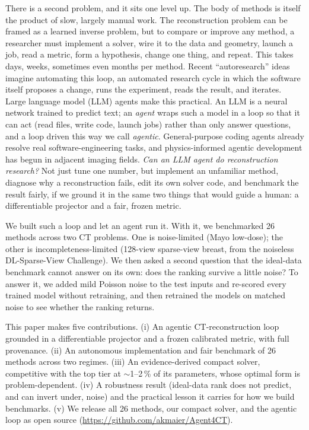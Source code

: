 \documentclass[AMA,twocolumn]{USG} %
\begin{document}
There is a second problem, and it sits one level up. The body of methods is itself the product of slow, largely manual work. The reconstruction problem can be framed as a learned inverse problem,\cite{ongie2020} but to compare or improve any method, a researcher must implement a solver, wire it to the data and geometry, launch a job, read a metric, form a hypothesis, change one thing, and repeat. This takes days, weeks, sometimes even months per method. Recent ``autoresearch'' ideas imagine automating this loop, an automated research cycle in which the software itself proposes a change, runs the experiment, reads the result, and iterates.\cite{karpathy2026autoresearch,lu2024aiscientist} Large language model (LLM) agents make this practical. An LLM is a neural network trained to predict text; an \emph{agent} wraps such a model in a loop so that it can act (read files, write code, launch jobs) rather than only answer questions, and a loop driven this way we call \emph{agentic}. General-purpose coding agents already resolve real software-engineering tasks,\cite{yang2024sweagent,jimenez2024swebench,maier2026vibecoding} and physics-informed agentic development has begun in adjacent imaging fields.\cite{zaiss2026agent4mr} \emph{Can an LLM agent do reconstruction research?} Not just tune one number, but implement an unfamiliar method, diagnose why a reconstruction fails, edit its own solver code, and benchmark the result fairly, if we ground it in the same two things that would guide a human: a differentiable projector and a fair, frozen metric.

We built such a loop and let an agent run it. With it, we benchmarked 26 methods across two CT problems. One is noise-limited (Mayo low-dose\cite{mccollough2017mayo}); the other is incompleteness-limited (128-view sparse-view breast, from the noiseless DL-Sparse-View Challenge\cite{sidky2022}). We then asked a second question that the ideal-data benchmark cannot answer on its own: does the ranking survive a little noise? To answer it, we added mild Poisson noise to the test inputs and re-scored every trained model without retraining, and then retrained the models on matched noise to see whether the ranking returns.

This paper makes five contributions. (i) An agentic CT-reconstruction loop grounded in a differentiable projector and a frozen calibrated metric, with full provenance. (ii) An autonomous implementation and fair benchmark of 26 methods across two regimes. (iii) An evidence-derived compact solver, competitive with the top tier at $\sim$1--2\,\% of its parameters, whose optimal form is problem-dependent. (iv) A robustness result (ideal-data rank does not predict, and can invert under, noise) and the practical lesson it carries for how we build benchmarks. (v) We release all 26 methods, our compact solver, and the agentic loop as open source (\url{https://github.com/akmaier/Agent4CT}).
\end{document}
